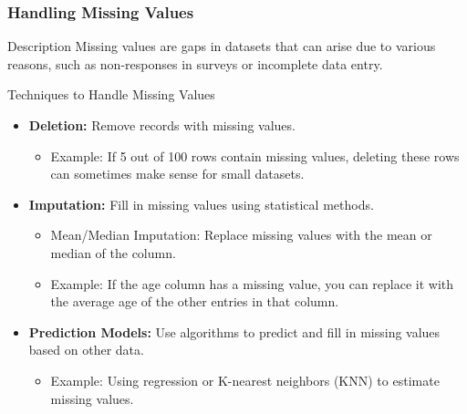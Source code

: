 \documentclass{beamer}
\begin{document}
\begin{frame}
    \frametitle{Handling Missing Values}
    \begin{block}{Description}
        Missing values are gaps in datasets that can arise due to various reasons, such as non-responses in surveys or incomplete data entry.
    \end{block}

    \begin{block}{Techniques to Handle Missing Values}
        \begin{itemize}
            \item \textbf{Deletion:} Remove records with missing values. 
            \begin{itemize}
                \item Example: If 5 out of 100 rows contain missing values, deleting these rows can sometimes make sense for small datasets.
            \end{itemize}
            \item \textbf{Imputation:} Fill in missing values using statistical methods.
            \begin{itemize}
                \item Mean/Median Imputation: Replace missing values with the mean or median of the column.
                \item Example: If the age column has a missing value, you can replace it with the average age of the other entries in that column.
            \end{itemize}
            \item \textbf{Prediction Models:} Use algorithms to predict and fill in missing values based on other data.
            \begin{itemize}
                \item Example: Using regression or K-nearest neighbors (KNN) to estimate missing values.
            \end{itemize}
        \end{itemize}
    \end{block}
\end{frame}
\end{document}
